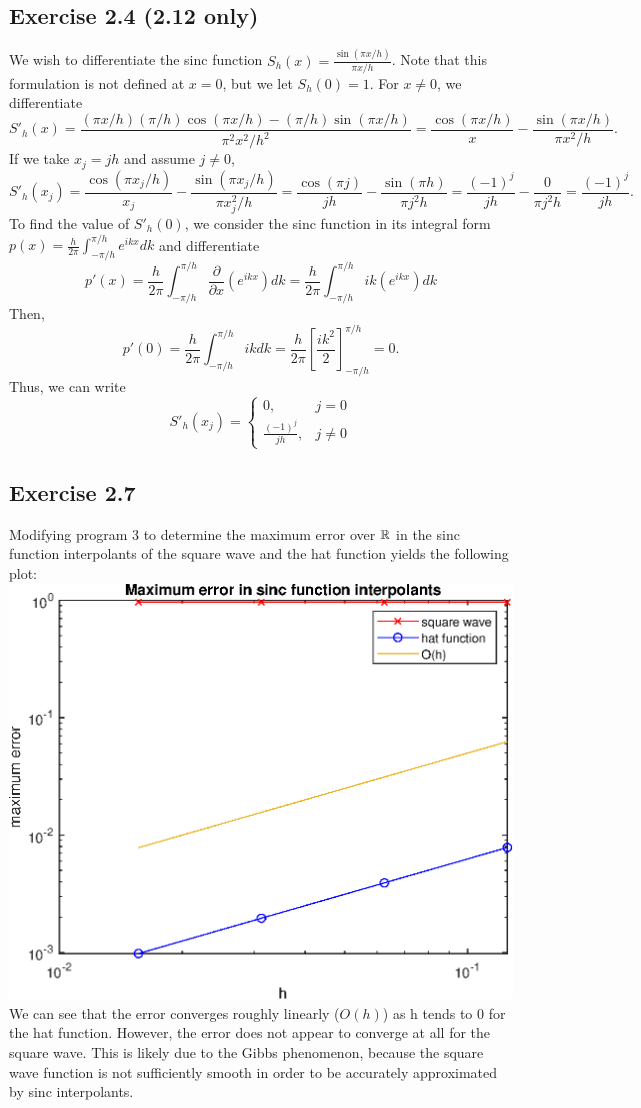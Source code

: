 \documentclass{article}
\begin{document}
\subsection{Exercise 2.4 (2.12 only)}
We wish to differentiate the sinc function $S_h(x)=\frac{\sin(\pi x/h)}{\pi x/h}$. Note that this formulation is not defined at $x=0$, but we let $S_h(0)=1$. For $x\neq0$, we differentiate
\[
S'_h(x)=\frac{(\pi x/h)(\pi/h)\cos(\pi x/h)-(\pi/h)\sin(\pi x/h)}{\pi^2x^2/h^2}=\frac{\cos(\pi x/h)}{x}-\frac{\sin(\pi x/h)}{\pi x^2/h}.
\]
If we take $x_j=jh$ and assume $j\neq0$, 
\[
S'_h(x_j)=\frac{\cos(\pi x_j/h)}{x_j}-\frac{\sin(\pi x_j/h)}{\pi x_j^2/h}=\frac{\cos(\pi j)}{jh}-\frac{\sin(\pi h)}{\pi j^2h}=\frac{(-1)^j}{jh}-\frac{0}{\pi j^2h}=\frac{(-1)^j}{jh}.
\]
To find the value of $S'_h(0)$, we consider the sinc function in its integral form $p(x)=\frac{h}{2\pi}\int_{-\pi/h}^{\pi/h}e^{ikx}dk$ and differentiate
\[
p'(x)=\frac{h}{2\pi}\int_{-\pi/h}^{\pi/h}\frac{\partial}{\partial x}(e^{ikx})dk=\frac{h}{2\pi}\int_{-\pi/h}^{\pi/h}ik(e^{ikx})dk
\]
Then,
\[
p'(0)=\frac{h}{2\pi}\int_{-\pi/h}^{\pi/h}ikdk=\frac{h}{2\pi}\left[\frac{ik^2}{2}\right]_{-\pi/h}^{\pi/h}=0.
\]
Thus, we can write 
\[
S'_h(x_j)= \begin{cases}
0, &j=0 \\
\frac{(-1)^j}{jh}, &j\neq0
\end{cases}
\]
\subsection{Exercise 2.7}
Modifying program 3 to determine the maximum error over $\mathbb{R}$ in the sinc function interpolants of the square wave and the hat function yields the following plot:\\
\includegraphics[]{p3.eps}
We can see that the error converges roughly linearly ($O(h)$) as h tends to 0 for the hat function. However, the error does not appear to converge at all for the square wave. This is likely due to the Gibbs phenomenon, because the square wave function is not sufficiently smooth in order to be accurately approximated by sinc interpolants. 
\end{document}
